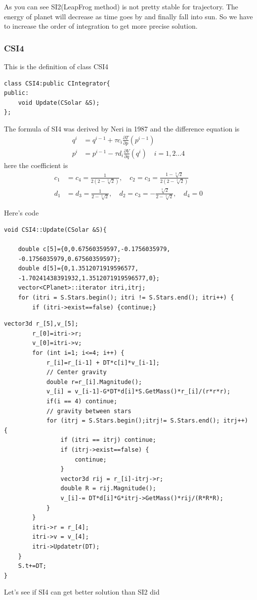 \documentclass[12pt]{article}
\begin{document}
As you can see SI2(LeapFrog method) is not pretty stable for trajectory.
The energy of planet will decrease as time goes by and finally fall into sun.
So we have to increase the order of integration to get more precise solution.


\clearpage
\subsubsection{CSI4}
This is the definition of class CSI4
\begin{lstlisting}[caption=CSI4 class]
class CSI4:public CIntegrator{
public:
    void Update(CSolar &S);
};
\end{lstlisting}

The formula of SI4 was derived by Neri\cite{SI4} in 1987 and the difference equation is
\begin{equation}
\begin{aligned}
q^i &= q^{i-1} + \tau c_{i} \frac{\partial T}{\partial p}\left(p^{i-1} \right) \\
p^i &= p^{i-1} - \tau d_{i} \frac{\partial V}{\partial q}\left(q^{i} \right) \quad i=1,2\dots 4
\end{aligned}
\end{equation}
here the coefficient is
\[
\begin{aligned}
c_{1} &= c_{4}=\frac{1}{2(2-\sqrt[3]{2})},\quad c_{2}=c_{3}=\frac{1-\sqrt[3]{2}}{2(2-\sqrt[3]{2})}\\
d_{1} &= d_{3}=\frac{1}{2-\sqrt[3]{2}},\quad d_{2}=c_{3}=-\frac{\sqrt[3]{2}}{2-\sqrt[3]{2}},\quad d_{4}=0
\end{aligned}
\]

Here's code
\begin{lstlisting}[caption=CSI4 Part I]
void CSI4::Update(CSolar &S){
    
    double c[5]={0,0.67560359597,-0.1756035979,
    -0.1756035979,0.67560359597};
    double d[5]={0,1.3512071919596577,
    -1.70241438391932,1.3512071919596577,0};
    vector<CPlanet>::iterator itri,itrj;
    for (itri = S.Stars.begin(); itri != S.Stars.end(); itri++) {
        if (itri->exist==false) {continue;}
\end{lstlisting}
\begin{lstlisting}[caption=CSI4 Part II]
        vector3d r_[5],v_[5];
        r_[0]=itri->r;
        v_[0]=itri->v;
        for (int i=1; i<=4; i++) {
            r_[i]=r_[i-1] + DT*c[i]*v_[i-1];
            // Center gravity
            double r=r_[i].Magnitude();
            v_[i] = v_[i-1]-G*DT*d[i]*S.GetMass()*r_[i]/(r*r*r);
            if(i == 4) continue;
            // gravity between stars
            for (itrj = S.Stars.begin();itrj!= S.Stars.end(); itrj++) {
                if (itri == itrj) continue;
                if (itrj->exist==false) {
                    continue;
                }
                vector3d rij = r_[i]-itrj->r;
                double R = rij.Magnitude();
                v_[i]-= DT*d[i]*G*itrj->GetMass()*rij/(R*R*R);
            }
        }   
        itri->r = r_[4];
        itri->v = v_[4];
        itri->Updatetr(DT);    
    }
    S.t+=DT;
}
\end{lstlisting}
\clearpage
Let's see if SI4 can get better solution than SI2 did
\end{document}
